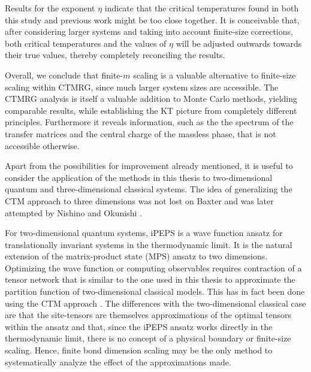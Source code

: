 Results for the exponent $\eta$ indicate that the critical temperatures found in both this study and previous work might
be too close together.
It is conceivable that, after considering larger systems and taking into account finite-size corrections,
both critical temperatures and the values of $\eta$ will be adjusted outwards towards their true values,
thereby completely reconciling the results.

Overall, we conclude that finite-$m$ scaling is a valuable alternative to finite-size scaling within CTMRG,
since much larger system sizes are accessible.
The CTMRG analysis is itself a valuable addition to Monte Carlo methods,
yielding comparable results, while establishing the KT picture from completely different principles.
Furthermore it reveals information, such as the the spectrum of the transfer matrices and the central charge of the
massless phase, that is not accessible otherwise.

Apart from the possibilities for improvement already mentioned, it is
useful to consider the application of the methods in this thesis to
two-dimensional quantum and three-dimensional classical systems. The idea
of generalizing the CTM approach to three dimensions was not lost on
Baxter \cite[p. 401]{baxter1982exactly} and was later attempted by Nishino
and Okunishi \cite{nishino1998density}.

For two-dimensional quantum systems, iPEPS \cite{jordan2008classical} is
a wave function ansatz for translationally invariant systems in the
thermodynamic limit. It is the natural extension of the matrix-product
state (MPS) ansatz to two dimensions.
Optimizing the wave function or computing observables requires contraction
of a tensor network that is similar to the one used in this thesis to
approximate the partition function of two-dimensional classical models.
This has in fact been done using the CTM approach
\cite{orus2009simulation}.
The differences with the two-dimensional classical case are that the
site-tensors are themselves approximations of the optimal tensors within
the ansatz and that, since the iPEPS ansatz works directly in the
thermodynamic limit, there is no concept of a physical boundary or
finite-size scaling. Hence, finite bond dimension scaling may be the only
method to systematically analyze the effect of the approximations made.

